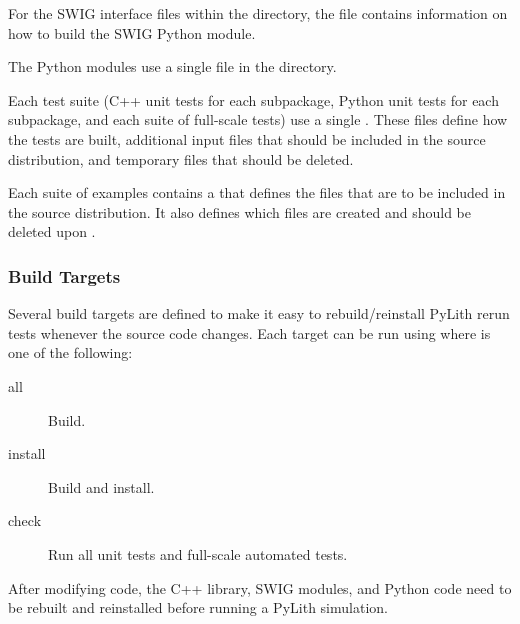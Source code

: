 For the SWIG interface files within the 
directory, the  file contains information on how
to build the SWIG Python module.

The Python modules use a single  file in
the  directory.

Each test suite (C++ unit tests for each subpackage, Python unit tests
for each subpackage, and each suite of full-scale tests) use a single
. These files define how the tests are built,
additional input files that should be included in the source
distribution, and temporary files that should be deleted.

Each suite of examples contains a  that defines
the files that are to be included in the source distribution. It also
defines which files are created and should be deleted upon
.

\subsubsection{Build Targets}

Several build targets are defined to make it easy to rebuild/reinstall
PyLith rerun tests whenever the source code changes. Each target can
be run using  where  is
one of the following:

\begin{description}
\item[all] Build.
\item[install] Build and install.
\item[check] Run all unit tests and full-scale automated tests.
\end{description}


After modifying code, the C++ library, SWIG modules, and Python code need to be rebuilt and reinstalled before running a
PyLith simulation.


